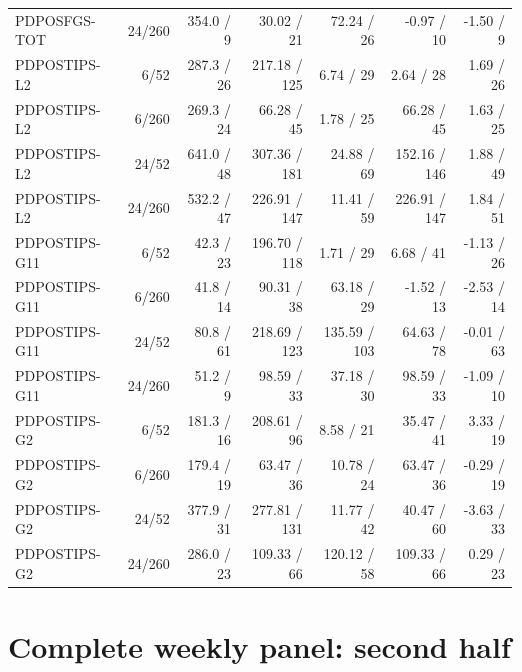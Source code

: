 \documentclass[11pt,a4paper]{article}
\begin{document}
\begin{longtable}{p{26mm}rrrrrr}
PDPOSFGS-TOT & 24/260 & 354.0 / 9 & 30.02 / 21 & 72.24 / 26 & -0.97 / 10 & -1.50 / 9 \\
PDPOSTIPS-L2 & 6/52 & 287.3 / 26 & 217.18 / 125 & 6.74 / 29 & 2.64 / 28 & 1.69 / 26 \\
PDPOSTIPS-L2 & 6/260 & 269.3 / 24 & 66.28 / 45 & 1.78 / 25 & 66.28 / 45 & 1.63 / 25 \\
PDPOSTIPS-L2 & 24/52 & 641.0 / 48 & 307.36 / 181 & 24.88 / 69 & 152.16 / 146 & 1.88 / 49 \\
PDPOSTIPS-L2 & 24/260 & 532.2 / 47 & 226.91 / 147 & 11.41 / 59 & 226.91 / 147 & 1.84 / 51 \\
PDPOSTIPS-G11 & 6/52 & 42.3 / 23 & 196.70 / 118 & 1.71 / 29 & 6.68 / 41 & -1.13 / 26 \\
PDPOSTIPS-G11 & 6/260 & 41.8 / 14 & 90.31 / 38 & 63.18 / 29 & -1.52 / 13 & -2.53 / 14 \\
PDPOSTIPS-G11 & 24/52 & 80.8 / 61 & 218.69 / 123 & 135.59 / 103 & 64.63 / 78 & -0.01 / 63 \\
PDPOSTIPS-G11 & 24/260 & 51.2 / 9 & 98.59 / 33 & 37.18 / 30 & 98.59 / 33 & -1.09 / 10 \\
PDPOSTIPS-G2 & 6/52 & 181.3 / 16 & 208.61 / 96 & 8.58 / 21 & 35.47 / 41 & 3.33 / 19 \\
PDPOSTIPS-G2 & 6/260 & 179.4 / 19 & 63.47 / 36 & 10.78 / 24 & 63.47 / 36 & -0.29 / 19 \\
PDPOSTIPS-G2 & 24/52 & 377.9 / 31 & 277.81 / 131 & 11.77 / 42 & 40.47 / 60 & -3.63 / 33 \\
PDPOSTIPS-G2 & 24/260 & 286.0 / 23 & 109.33 / 66 & 120.12 / 58 & 109.33 / 66 & 0.29 / 23 \\
\end{longtable}
\endgroup

\section{Complete weekly panel: second half}\label{sup:panel-second}
\end{document}
